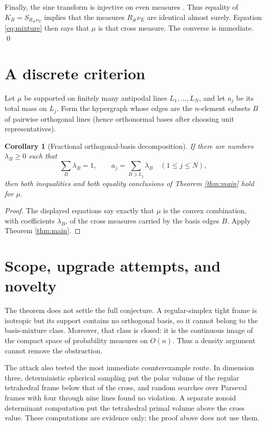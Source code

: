 \documentclass[11pt]{article}
\newtheorem{corollary}[theorem]{Corollary}
\begin{document}
Finally, the sine transform is injective on even measures
\cite[Proposition 2.1]{MS}.  Thus equality of $K_R=S_{R_\#\nu_E}$ implies
that the measures $R_\#\nu_E$ are identical almost surely.  Equation
\eqref{eq:mixture} then says that $\mu$ is that cross measure.  The converse
is immediate. \qed

\section{A discrete criterion}

Let $\mu$ be supported on finitely many antipodal lines $L_1,\dots,L_N$,
and let $a_j$ be its total mass on $L_j$.  Form the hypergraph whose edges
are the $n$-element subsets $B$ of pairwise orthogonal lines (hence
orthonormal bases after choosing unit representatives).

\begin{corollary}[Fractional orthogonal-basis decomposition]
If there are numbers $\lambda_B\ge0$ such that
\[
 \sum_B\lambda_B=1,
 \qquad
 a_j=\sum_{B\ni L_j}\lambda_B\quad(1\le j\le N),
\]
then both inequalities and both equality conclusions of Theorem
\ref{thm:main} hold for $\mu$.
\end{corollary}

\begin{proof}
The displayed equations say exactly that $\mu$ is the convex combination,
with coefficients $\lambda_B$, of the cross measures carried by the basis
edges $B$.  Apply Theorem \ref{thm:main}.
\end{proof}

\section{Scope, upgrade attempts, and novelty}

The theorem does not settle the full conjecture.  A regular-simplex tight
frame is isotropic but its support contains no orthogonal basis, so it cannot
belong to the basis-mixture class.  Moreover, that class is closed: it is the
continuous image of the compact space of probability measures on $O(n)$.
Thus a density argument cannot remove the obstruction.

The attack also tested the most immediate counterexample route.  In dimension
three, deterministic spherical sampling put the polar volume of the regular
tetrahedral frame below that of the cross, and random searches over Parseval
frames with four through nine lines found no violation.  A separate zonoid
determinant computation put the tetrahedral primal volume above the cross
value.  These computations are evidence only; the proof above does not use
them.
\end{document}
